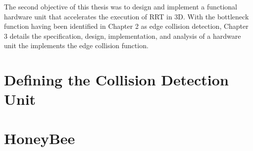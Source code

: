 
The second objective of this thesis was to design and implement a functional hardware unit that accelerates the execution of \gls{RRT} in \gls{3D}. With the bottleneck function having been identified in Chapter 2 as edge collision detection, Chapter 3 details the specification, design, implementation, and analysis of a hardware unit the implements the edge collision function.

\section{Defining the Collision Detection Unit}
    

\newpage

\section{HoneyBee}
    